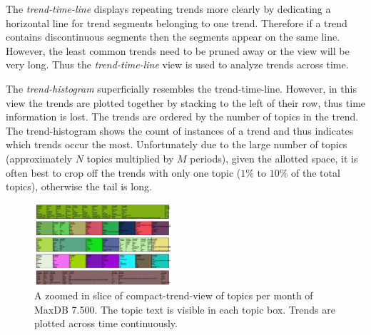 \documentclass[times, 10pt,twocolumn]{article}
\begin{document}
The \emph{trend-time-line} displays repeating trends more clearly by
dedicating a horizontal line for trend segments belonging to one
trend. Therefore if a trend contains discontinuous segments then
the segments appear on the same line.  However, the least common
trends need to be pruned away or the view will be very long. 
Thus the \emph{trend-time-line} view is used to analyze trends across time.

 The
\emph{trend-histogram} superficially resembles the trend-time-line.
However, in this view the trends are plotted together by stacking to
the left of their row, thus time information is lost.  The trends are
ordered by the number of topics in the trend.  The trend-histogram
shows the count of instances of a trend and thus indicates which
trends occur the most. Unfortunately due to the large number of topics
(approximately $N$ topics multiplied by $M$ periods), given the
allotted space, it is often best to crop off the trends with only one
topic ($1\%$ to $10\%$ of the total topics), otherwise the tail is
long. 


\begin{figure}[t]
  \centering
  \includegraphics[width=0.45\textwidth]{fixed-time-smear-plot-cropped}
  \caption{A zoomed in slice of compact-trend-view of topics per month of MaxDB 7.500. The topic text is visible in each topic box. Trends are plotted across time continuously.}
  \label{fig:zoomedsmear}
\end{figure}
\end{document}
